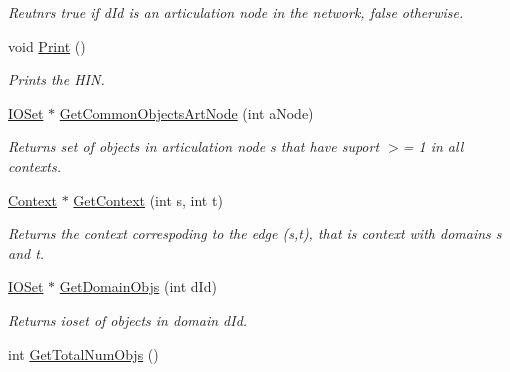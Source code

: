 \begin{DoxyCompactItemize}
\begin{DoxyCompactList}\small\item\em Reutnrs true if dId is an articulation node in the network, false otherwise. \item\end{DoxyCompactList}\item 
\hypertarget{class_relation_graph_a1a3279bf6ed14795cf41124f9cc730ac}{
void \hyperlink{class_relation_graph_a1a3279bf6ed14795cf41124f9cc730ac}{Print} ()}
\label{class_relation_graph_a1a3279bf6ed14795cf41124f9cc730ac}

\begin{DoxyCompactList}\small\item\em Prints the HIN. \item\end{DoxyCompactList}\item 
\hypertarget{class_relation_graph_aafd5077de89b1c01d1170581123f8566}{
\hyperlink{class_i_o_set}{IOSet} $\ast$ \hyperlink{class_relation_graph_aafd5077de89b1c01d1170581123f8566}{GetCommonObjectsArtNode} (int aNode)}
\label{class_relation_graph_aafd5077de89b1c01d1170581123f8566}

\begin{DoxyCompactList}\small\item\em Returns set of objects in articulation node s that have suport $>$= 1 in all contexts. \item\end{DoxyCompactList}\item 
\hypertarget{class_relation_graph_aed7ec9b885e3f3cba079232e0a59b027}{
\hyperlink{class_context}{Context} $\ast$ \hyperlink{class_relation_graph_aed7ec9b885e3f3cba079232e0a59b027}{GetContext} (int s, int t)}
\label{class_relation_graph_aed7ec9b885e3f3cba079232e0a59b027}

\begin{DoxyCompactList}\small\item\em Returns the context correspoding to the edge (s,t), that is context with domains s and t. \item\end{DoxyCompactList}\item 
\hypertarget{class_relation_graph_afc38e287452ec3c9c9fc779146c490de}{
\hyperlink{class_i_o_set}{IOSet} $\ast$ \hyperlink{class_relation_graph_afc38e287452ec3c9c9fc779146c490de}{GetDomainObjs} (int dId)}
\label{class_relation_graph_afc38e287452ec3c9c9fc779146c490de}

\begin{DoxyCompactList}\small\item\em Returns ioset of objects in domain dId. \item\end{DoxyCompactList}\item 
\hypertarget{class_relation_graph_ad5d7fc6f4ff141685902663b732768a7}{
int \hyperlink{class_relation_graph_ad5d7fc6f4ff141685902663b732768a7}{GetTotalNumObjs} ()}
\label{class_relation_graph_ad5d7fc6f4ff141685902663b732768a7}


\end{DoxyCompactItemize}
